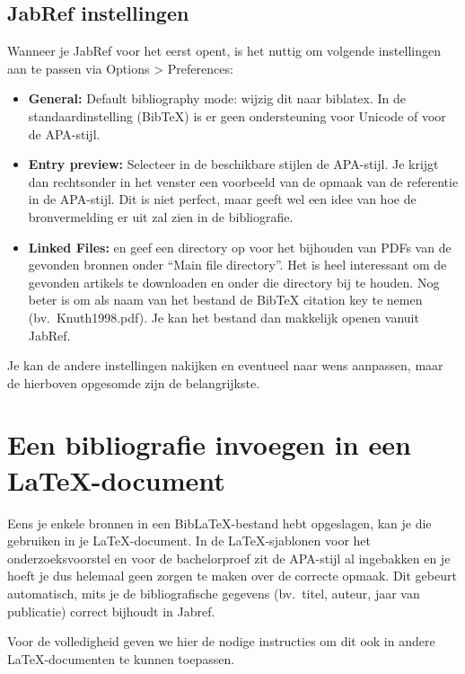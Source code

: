 \subsection{JabRef instellingen}%
\label{sub:jabref_instellingen}

Wanneer je JabRef voor het eerst opent, is het nuttig om volgende instellingen aan te passen via Options > Preferences:

\begin{itemize}
  \item \textbf{General:} Default bibliography mode: wijzig dit naar biblatex. In de standaardinstelling (BibTeX) is er geen ondersteuning voor Unicode of voor de APA-stijl.
  \item \textbf{Entry preview:} Selecteer in de beschikbare stijlen de APA-stijl. Je krijgt dan rechtsonder in het venster een voorbeeld van de opmaak van de referentie in de APA-stijl. Dit is niet perfect, maar geeft wel een idee van hoe de bronvermelding er uit zal zien in de bibliografie.
  \item \textbf{Linked Files:} en geef een directory op voor het bijhouden van PDFs van de gevonden bronnen onder ``Main file directory''. Het is heel interessant om de gevonden artikels te downloaden en onder die directory bij te houden. Nog beter is om als naam van het bestand de BibTeX citation key te nemen (bv.\ Knuth1998.pdf). Je kan het bestand dan makkelijk openen vanuit JabRef.
\end{itemize}

Je kan de andere instellingen nakijken en eventueel naar wens aanpassen, maar de hierboven opgesomde zijn de belangrijkste.

\section{Een bibliografie invoegen in een {\LaTeX}-document}%
\label{sec:een_bibliografie_invoegen_in_een_latex_document}

Eens je enkele bronnen in een Bib{\LaTeX}-bestand hebt opgeslagen, kan je die gebruiken in je {\LaTeX}-document. In de {\LaTeX}-sjablonen voor het onderzoeksvoorstel en voor de bachelorproef zit de APA-stijl al ingebakken en je hoeft je dus helemaal geen zorgen te maken over de correcte opmaak. Dit gebeurt automatisch, mits je de bibliografische gegevens (bv.\ titel, auteur, jaar van publicatie) correct bijhoudt in Jabref.

Voor de volledigheid geven we hier de nodige instructies om dit ook in andere {\LaTeX}-documenten te kunnen toepassen.


